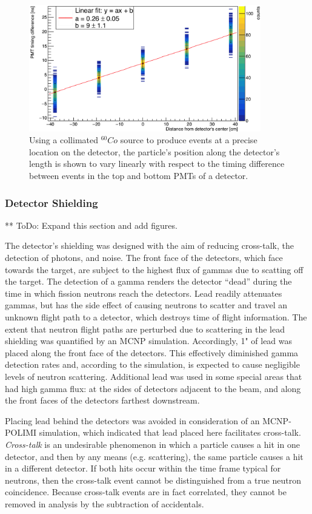 \begin{figure}
    \centering
    \includegraphics[width = 0.9\textwidth]{Content/Methods/PMTDifference.png}
    \caption{Using a collimated $^{60}Co$ source to produce events at a precise location on the detector, the particle's position along the detector's length is shown to vary linearly with respect to the timing difference between events in the top and bottom PMTs of a detector.}
    \label{fig:PMTDifference}
\end{figure}
\subsubsection{Detector Shielding}
** ToDo: Expand this section and add figures. 

The detector's shielding was designed with the aim of reducing cross-talk, the detection of photons, and noise. 
The front face of the detectors, which face towards the target, are subject to the highest flux of gammas due to scatting off the target. The detection of a gamma renders the detector ``dead'' during the time in which fission neutrons reach the detectors. Lead readily attenuates gammas, but has the side effect of causing neutrons to scatter and travel an unknown flight path to a detector, which destroys time of flight information. The extent that neutron flight paths are perturbed due to scattering in the lead shielding was quantified by an MCNP simulation. Accordingly, 1" of lead was placed along the front face of the detectors. This effectively diminished gamma detection rates and, according to the simulation, is expected to cause negligible levels of neutron scattering. Additional lead was used in some special areas that had high gamma flux: at the sides of detectors adjacent to the beam, and along the front faces of the detectors farthest downstream. 

Placing lead behind the detectors was avoided in consideration of an MCNP-POLIMI simulation, which indicated that lead placed here facilitates cross-talk. \textit{Cross-talk} is an undesirable phenomenon in which a particle causes a hit in one detector, and then by any means (e.g. scattering), the same particle causes a hit in a different detector. If both hits occur within the time frame typical for neutrons, then the cross-talk event cannot be distinguished from a true neutron coincidence. Because cross-talk events are in fact correlated, they cannot be removed in analysis by the subtraction of accidentals. 

